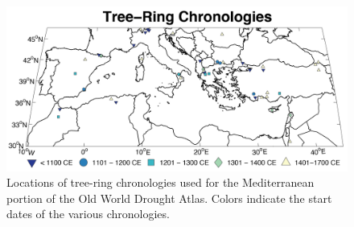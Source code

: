 \documentclass[draft,jgr]{AGUTeX}
\begin{document}
%
%
%
%
%
%


\newpage

\begin{figure}
\center
\includegraphics[width=1.0\columnwidth]{fig_01_map_sites.png}
\caption{Locations of tree-ring chronologies used for the Mediterranean portion of the Old World Drought Atlas. Colors indicate the start dates of the various chronologies.}\label{placeholder}
\end{figure}
\end{document}
